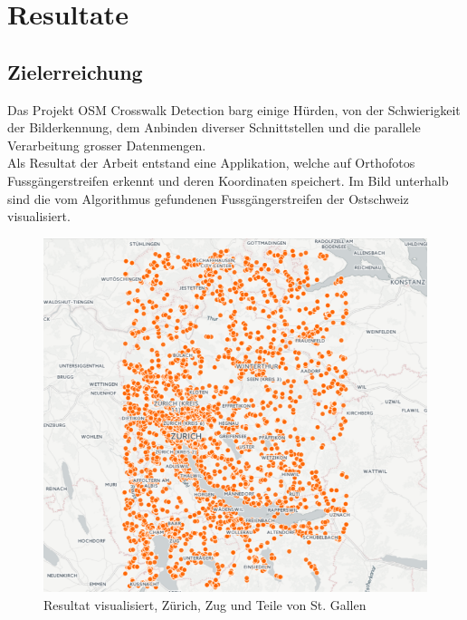 \newpage
\section{Resultate}
\subsection{Zielerreichung}
Das Projekt OSM Crosswalk Detection barg einige Hürden, von der Schwierigkeit der Bilderkennung, dem Anbinden diverser Schnittstellen und die parallele Verarbeitung grosser Datenmengen.\\
Als Resultat der Arbeit entstand eine Applikation, welche auf Orthofotos Fussgängerstreifen erkennt und deren Koordinaten speichert. Im Bild unterhalb sind die vom Algorithmus gefundenen Fussgängerstreifen der Ostschweiz visualisiert. \\
\begin{figure}[H]
\centering
\includegraphics[width=350pt]{images/result_points.png}
\caption[Resultat visualisiert]{Resultat visualisiert, Zürich, Zug und Teile von St. Gallen}
\end{figure}

\newpage
